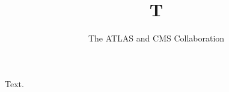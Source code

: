 \documentclass{svjour3}
\begin{document}
\title{T}
\author{The ATLAS and CMS Collaboration}
\maketitle
Text.
\end{document}
